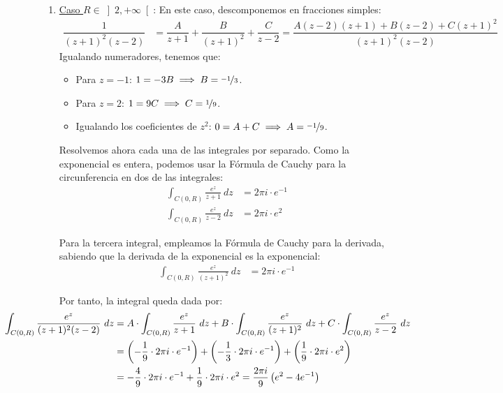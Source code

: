 \documentclass[12pt]{article}
\begin{document}
\begin{ejercicio}[2 puntos]
\begin{enumerate}
            \item \ul{Caso $R\in \left]2,+\infty\right[$}: En este caso, descomponemos en fracciones simples:
            \begin{align*}
                \dfrac{1}{(z + 1)^2(z - 2)} &= \dfrac{A}{z + 1} + \dfrac{B}{(z + 1)^2} + \dfrac{C}{z - 2}
                = \dfrac{A(z - 2)(z + 1) + B(z - 2) + C(z + 1)^2}{(z + 1)^2(z - 2)}
            \end{align*}
            Igualando numeradores, tenemos que:
            \begin{itemize}
                \item Para $z = -1$: $1=-3B\implies B=\nicefrac{-1}{3}$.
                \item Para $z = 2$: $1=9C\implies C=\nicefrac{1}{9}$.
                \item Igualando los coeficientes de $z^2$: $0=A+C\implies A=\nicefrac{-1}{9}$.
            \end{itemize}

            Resolvemos ahora cada una de las integrales por separado. Como la exponencial es entera, podemos usar la Fórmula de Cauchy para la circunferencia en dos de las integrales:
            \begin{align*}
                \int_{C(0,R)} \frac{e^z}{z + 1}\ dz &= 2\pi i \cdot e^{-1}\\
                \int_{C(0,R)} \frac{e^z}{z-2}\ dz &= 2\pi i \cdot e^{2}
            \end{align*}

            Para la tercera integral, empleamos la Fórmula de Cauchy para la derivada, sabiendo que la derivada de la exponencial es la exponencial:
            \begin{align*}
                \int_{C(0,R)} \frac{e^z}{(z + 1)^2}\ dz &= 2\pi i \cdot e^{-1}
            \end{align*}

            Por tanto, la integral queda dada por:
            \begin{align*}
                \hspace{-2cm}\int_{C(0,R)} \frac{e^z}{(z + 1)^2(z - 2)}\ dz &= A\cdot \int_{C(0,R)} \frac{e^z}{z + 1}\ dz + B\cdot \int_{C(0,R)} \frac{e^z}{(z + 1)^2}\ dz + C\cdot \int_{C(0,R)} \frac{e^z}{z - 2}\ dz\\
                \hspace{-2cm}&= \left(-\frac{1}{9}\cdot 2\pi i \cdot e^{-1}\right) + \left(-\frac{1}{3}\cdot 2\pi i \cdot e^{-1}\right) + \left(\frac{1}{9}\cdot 2\pi i \cdot e^{2}\right)\\
                \hspace{-2cm}&= -\dfrac{4}{9}\cdot 2\pi i\cdot e^{-1} + \dfrac{1}{9}\cdot 2\pi i\cdot e^{2}
                = \dfrac{2\pi i}{9}\left(e^{2} - 4e^{-1}\right)
            \end{align*}
        \end{enumerate}
    \end{ejercicio}
\end{document}
